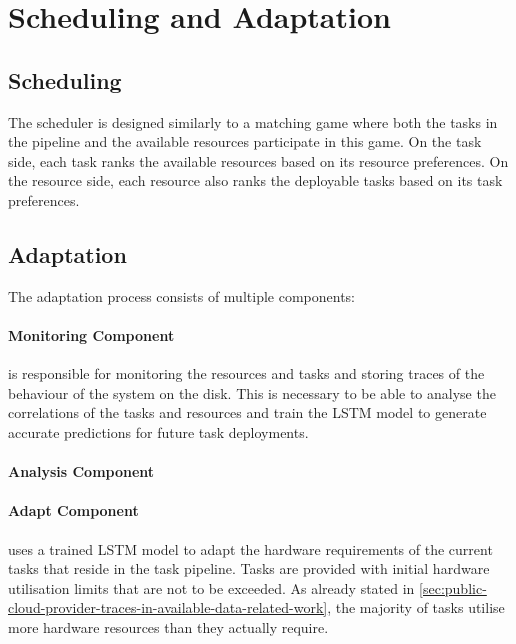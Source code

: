     \section{Scheduling and Adaptation}
    \label{sec:scheduling-and-adaptation-background}

        \subsection{Scheduling}
        \label{sec:scheduling-saa-background}

            The scheduler is designed similarly to a matching game where both the tasks in the pipeline and the available resources participate in this game.
            On the task side, each task ranks the available resources based on its resource preferences.
            On the resource side, each resource also ranks the deployable tasks based on its task preferences.

        \subsection{Adaptation}
        \label{sec:adaptation-saa-background}

            The adaptation process consists of multiple components:

            \paragraph{Monitoring Component } is responsible for monitoring the resources and tasks and storing traces of the behaviour of the system on the disk.
            This is necessary to be able to analyse the correlations of the tasks and resources and train the LSTM model to generate accurate predictions for future task deployments.

            \paragraph{Analysis Component } 
            
            \paragraph{Adapt Component } uses a trained LSTM model to adapt the hardware requirements of the current tasks that reside in the task pipeline.
            Tasks are provided with initial hardware utilisation limits that are not to be exceeded. As already stated in \ref{sec:public-cloud-provider-traces-in-available-data-related-work}, the majority of tasks utilise more hardware resources than they actually require.

